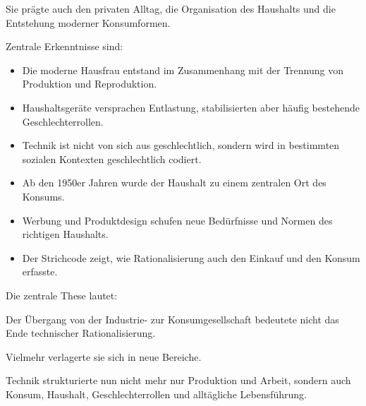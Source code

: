Sie prägte auch den privaten Alltag,
die Organisation des Haushalts
und die Entstehung moderner Konsumformen.

Zentrale Erkenntnisse sind:

\begin{itemize}
\item Die moderne Hausfrau entstand im Zusammenhang mit der Trennung von Produktion und Reproduktion.
\item Haushaltsgeräte versprachen Entlastung, stabilisierten aber häufig bestehende Geschlechterrollen.
\item Technik ist nicht von sich aus geschlechtlich, sondern wird in bestimmten sozialen Kontexten geschlechtlich codiert.
\item Ab den 1950er Jahren wurde der Haushalt zu einem zentralen Ort des Konsums.
\item Werbung und Produktdesign schufen neue Bedürfnisse und Normen des richtigen Haushalts.
\item Der Strichcode zeigt, wie Rationalisierung auch den Einkauf und den Konsum erfasste.
\end{itemize}

Die zentrale These lautet:

Der Übergang von der Industrie- zur Konsumgesellschaft
bedeutete nicht das Ende technischer Rationalisierung.

Vielmehr verlagerte sie sich in neue Bereiche.

Technik strukturierte nun nicht mehr nur Produktion und Arbeit,
sondern auch Konsum,
Haushalt,
Geschlechterrollen und alltägliche Lebensführung.
